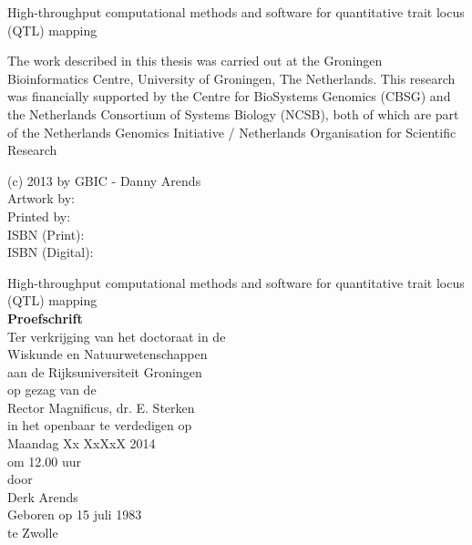 \documentclass[11pt, twoside]{extbook}
\newcommand{\bold}[1]{{\bfseries #1}}
\newcommand{\mytitle}[1]{{\LARGE #1}}
\begin{document}
  \thispagestyle{empty}
  \begin{center}
  \mytitle{ High-throughput computational methods and software for quantitative trait locus (QTL) mapping }\\
  \end{center}
\newpage
  \thispagestyle{empty}
  \noindent The work described in this thesis was carried out at the Groningen 
  Bioinformatics Centre, University of Groningen, The Netherlands. This research 
  was financially supported by the Centre for BioSystems Genomics (CBSG) and the 
  Netherlands Consortium of Systems Biology (NCSB), both of which are part of the 
  Netherlands Genomics Initiative / Netherlands Organisation for Scientific Research\\
  \vspace{110 mm}
  
  \noindent (c) 2013 by GBIC - Danny Arends\\
  Artwork by:\\
  Printed by:\\
  ISBN (Print):\\
  ISBN (Digital):\\
\newpage

\thispagestyle{empty}
\begin{center}
  \mytitle{ High-throughput computational methods and software for quantitative trait locus (QTL) mapping }\\
    \vspace{10 mm}
  \bold{Proefschrift}\\
    \vspace{10 mm}
  Ter verkrijging van het doctoraat in de \\
  Wiskunde en Natuurwetenschappen \\
  aan de Rijksuniversiteit Groningen \\
  op gezag van de \\
  Rector Magnificus, dr. E. Sterken\\ 
  in het openbaar te verdedigen op \\
  Maandag Xx XxXxX 2014 \\
  om 12.00 uur \\
    \vspace{10 mm}
  door\\
    \vspace{10 mm}
  Derk Arends\\
    \vspace{10 mm}
  Geboren op 15 juli 1983\\
  te Zwolle
\end{center}
\end{document}
